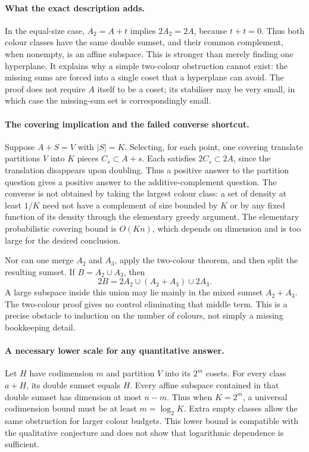 \documentclass[11pt,a4paper]{article}
\begin{document}
\paragraph{What the exact description adds.}
In the equal-size case, $A_2=A+t$ implies $2A_2=2A$, because $t+t=0$. Thus both colour classes have the same double sumset, and their common complement, when nonempty, is an affine subspace. This is stronger than merely finding one hyperplane. It explains why a simple two-colour obstruction cannot exist: the missing sums are forced into a single coset that a hyperplane can avoid. The proof does not require $A$ itself to be a coset; its stabiliser may be very small, in which case the missing-sum set is correspondingly small.

\paragraph{The covering implication and the failed converse shortcut.}
Suppose $A+S=V$ with $|S|=K$. Selecting, for each point, one covering translate partitions $V$ into $K$ pieces $C_s\subset A+s$. Each satisfies $2C_s\subset2A$, since the translation disappears upon doubling. Thus a positive answer to the partition question gives a positive answer to the additive-complement question. The converse is not obtained by taking the largest colour class: a set of density at least $1/K$ need not have a complement of size bounded by $K$ or by any fixed function of its density through the elementary greedy argument. The elementary probabilistic covering bound is $O(Kn)$, which depends on dimension and is too large for the desired conclusion.

Nor can one merge $A_2$ and $A_3$, apply the two-colour theorem, and then split the resulting sumset. If $B=A_2\cup A_3$, then
\[
 2B=2A_2\cup(A_2+A_3)\cup2A_3.
\]
A large subspace inside this union may lie mainly in the mixed sumset $A_2+A_3$. The two-colour proof gives no control eliminating that middle term. This is a precise obstacle to induction on the number of colours, not simply a missing bookkeeping detail.

\paragraph{A necessary lower scale for any quantitative answer.}
Let $H$ have codimension $m$ and partition $V$ into its $2^m$ cosets. For every class $a+H$, its double sumset equals $H$. Every affine subspace contained in that double sumset has dimension at most $n-m$. Thus when $K=2^m$, a universal codimension bound must be at least $m=\log_2K$. Extra empty classes allow the same obstruction for larger colour budgets. This lower bound is compatible with the qualitative conjecture and does not show that logarithmic dependence is sufficient.
\end{document}
